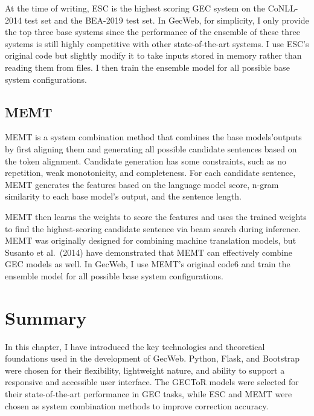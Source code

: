 At the time of writing, ESC is the highest scoring GEC system on the CoNLL-2014 test set and the BEA-2019 test set.
In GecWeb, for simplicity, I only provide the top three base systems since the performance of the
ensemble of these three systems is still highly competitive with other state-of-the-art systems.
I use ESC's original code but slightly modify it to take inputs stored in memory rather than reading them from files.
I then train the ensemble model for all possible base system configurations.

\subsection{MEMT}
\label{memt}

MEMT is a system combination method that combines the base models'outputs by first aligning
them and generating all possible candidate sentences based on the token alignment.
Candidate generation has some constraints, such as no repetition, weak monotonicity, and completeness.
For each candidate sentence, MEMT generates the features based on the language model score, n-gram
similarity to each base model's output, and the sentence length.

MEMT then learns the weights to score the features and uses the trained weights to find the highest-scoring candidate sentence via beam search during inference.
MEMT was originally designed for combining machine translation models, but Susanto et al.~(2014) have demonstrated that MEMT can effectively combine GEC models as well.
In GecWeb, I use MEMT's original code6 and train the ensemble model for all possible base system configurations.

\section{Summary}
\label{summary}

In this chapter, I have introduced the key technologies and theoretical foundations used in the development of GecWeb.
Python, Flask, and Bootstrap were chosen for their flexibility, lightweight nature, and ability to support a responsive and accessible user interface.
The GECToR models were selected for their state-of-the-art performance in GEC tasks, while ESC and MEMT were chosen as system combination methods to improve correction accuracy.
